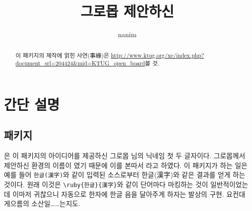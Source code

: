 \documentclass[a4paper,12pt,itemph,footnote]{oblivoir}
\begin{document}
\title{그로몹 제안하신 }
\author{nanim}
\maketitle

\begin{abstract}
이 패키지의 제작에 얽힌 \grfoo 사연(事緣)은 \url{http://www.ktug.org/xe/index.php?document_srl=204424&mid=KTUG_open_board}\을 볼 것.
\end{abstract}

\section{간단 설명}

\subsection{패키지}

\begin{myexam}
\usepackage[rubystyle=<default|XXruby|ruby|progress|rup>,rubycolor=<color>]{grruby}
\end{myexam}
은 이 패키지의 아이디어를 제공하신 그로몹 님의 닉네임 첫 두 글자이다.
그로몹께서 제안하신 환경의 이름이 였기 때문에 이를 본따서 라고 하였다.
이 패키지가 하는 일은 예를 들어 \texttt{한글(漢字)}와 같이 입력된 소스로부터 \grfoo 한글(漢字)와 같은
결과를 얻게 하는 것이다. 원래 이것은 \verb|\ruby{한글}{漢字}|와 같이 단어마다 마킹하는 것이
일반적이었는데 이마저 귀찮으니 자동으로 한자에 한글 음을 달아주게 하자는 발상의 구현. 요컨대 게으름의 소산일\ldots\ldots 는지도.
\end{document}
